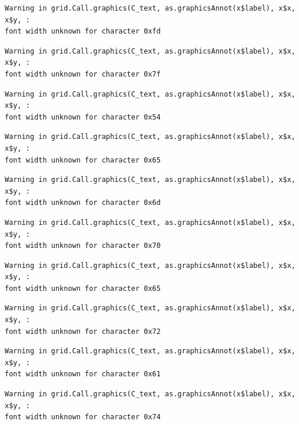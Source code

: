 \documentclass[
  letterpaper,
  DIV=11,
  numbers=noendperiod]{scrreprt}
\begin{document}
\begin{verbatim}
Warning in grid.Call.graphics(C_text, as.graphicsAnnot(x$label), x$x, x$y, :
font width unknown for character 0xfd
\end{verbatim}

\begin{verbatim}
Warning in grid.Call.graphics(C_text, as.graphicsAnnot(x$label), x$x, x$y, :
font width unknown for character 0x7f
\end{verbatim}

\begin{verbatim}
Warning in grid.Call.graphics(C_text, as.graphicsAnnot(x$label), x$x, x$y, :
font width unknown for character 0x54
\end{verbatim}

\begin{verbatim}
Warning in grid.Call.graphics(C_text, as.graphicsAnnot(x$label), x$x, x$y, :
font width unknown for character 0x65
\end{verbatim}

\begin{verbatim}
Warning in grid.Call.graphics(C_text, as.graphicsAnnot(x$label), x$x, x$y, :
font width unknown for character 0x6d
\end{verbatim}

\begin{verbatim}
Warning in grid.Call.graphics(C_text, as.graphicsAnnot(x$label), x$x, x$y, :
font width unknown for character 0x70
\end{verbatim}

\begin{verbatim}
Warning in grid.Call.graphics(C_text, as.graphicsAnnot(x$label), x$x, x$y, :
font width unknown for character 0x65
\end{verbatim}

\begin{verbatim}
Warning in grid.Call.graphics(C_text, as.graphicsAnnot(x$label), x$x, x$y, :
font width unknown for character 0x72
\end{verbatim}

\begin{verbatim}
Warning in grid.Call.graphics(C_text, as.graphicsAnnot(x$label), x$x, x$y, :
font width unknown for character 0x61
\end{verbatim}

\begin{verbatim}
Warning in grid.Call.graphics(C_text, as.graphicsAnnot(x$label), x$x, x$y, :
font width unknown for character 0x74
\end{verbatim}
\end{document}
